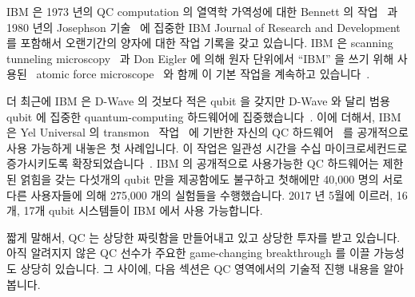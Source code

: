 IBM 은 1973 년의 QC computation 의 열역학 가역성에 대한 Bennett 의
작업~\cite{Bennett:1973:LRC:1664562.1664568} 과 1980 년의 Josephson
기술~\cite{1980:1663086} 에 집중한 IBM Journal of Research and Development 를
포함해서 오랜기간의 양자에 대한 작업 기록을 갖고 있습니다.
IBM 은 scanning tunneling microscopy~\cite{Binnig1982SurfaceSTM} 과 Don Eigler
에 의해 원자 단위에서 ``IBM'' 을 쓰기 위해
사용된~\cite{MalcolmWBrowne1990AFM-IBM} atomic force
microscope~\cite{1986PhRvL..56..930B} 와 함께 이 기본 작업을 계속하고
있습니다~\cite{Binnig1982SurfaceSTM}.

더 최근에 IBM 은 D-Wave 의 것보다 적은 qubit 을 갖지만 D-Wave 와 달리 범용
qubit 에 집중한 quantum-computing 하드웨어에
집중했습니다~\cite{BradJones2017IBM-QC-Announce,RobertHackett2017IBM-QC-Announce,AgamShah2017IBM-QC-50-qubit,DarioGill2017IBM-Universal-QC}.
이에 더해서, IBM 은 Yel Universal 의 transmon~\cite{WikipediaTransMon}
작업~\cite{PhysRevA.76.042319} 에 기반한 자신의 QC
하드웨어~\cite{IBM2016QuantumExperience,ArsTechnica2016IBMQuantumExperience,MikeVizard2017IBM-QC-Cloud}
를 공개적으로 사용 가능하게 내놓은 첫 사례입니다.
이 작업은 일관성 시간을 수십 마이크로세컨드로 증가시키도록
확장되었습니다~\cite{PhysRevLett.107.240501,PhysRevLett.111.080502,PhysRevB.86.100506}.
IBM 의 공개적으로 사용가능한 QC 하드웨어는 제한된 얽힘을 갖는 다섯개의 qubit
만을 제공함에도 불구하고 첫해에만 40,000 명의 서로 다른 사용자들에 의해 275,000
개의 실험들을 수행했습니다.
2017 년 5월에 이르러, 16개, 17개 qubit 시스템들이 IBM 에서 사용 가능합니다.

짧게 말해서, QC 는 상당한 짜릿함을 만들어내고 있고 상당한 투자를 받고 있습니다.
아직 알려지지 않은 QC 선수가 주요한 game-changing breakthrough 를 이끌 가능성도
상당히 있습니다.
그 사이에, 다음 섹션은 QC 영역에서의 기술적 진행 내용을 알아봅니다.
\iffalse


